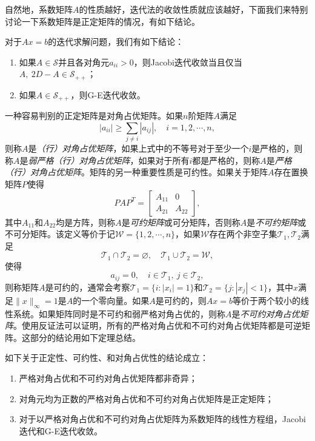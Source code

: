 \documentclass[a4paper,10pt]{ctexart}
\begin{document}
自然地，系数矩阵$ A $的性质越好，迭代法的收敛性质就应该越好，下面我们来特别讨论一下系数矩阵是正定矩阵的情况，有如下结论。
\begin{theorem}
    对于$ Ax=b $的迭代求解问题，我们有如下结论：
    \begin{enumerate}
        \item 如果$ A\in \mathcal{S} $并且各对角元$ a_{ii}>0 $，则Jacobi迭代收敛当且仅当$ A,\ 2D-A\in \mathcal{S}_{++} $；
        \item 如果$ A\in \mathcal{S}_{++} $，则G-E迭代收敛。
    \end{enumerate}
\end{theorem}
一种容易判别的正定矩阵是对角占优矩阵。如果$ n $阶矩阵$ A $满足
\[
    |a_{ii}| \geqslant  \sum_{j\neq i} |a_{ij}|,\quad i=1,2,\cdots,n,
\]
则称$ A $是\emph{（行）对角占优矩阵}，如果上式中的不等号对于至少一个$ i $是严格的，则称$ A $是\emph{弱严格（行）对角占优矩阵}，如果对于所有$ i $都是严格的，则称$ A $是\emph{严格（行）对角占优矩阵}。矩阵的另一种重要性质是可约性。如果关于矩阵$ A $存在置换矩阵$ P $使得
\[
    PAP^T = 
    \begin{bmatrix} 
        A_{11} & 0 \\
        A_{21} & A_{22} 
    \end{bmatrix},
\]
其中$ A_{11} $和$ A_{22} $均是方阵，则称$ A $是\emph{可约矩阵}或可分矩阵，否则称$ A $是\emph{不可约矩阵}或不可分矩阵。该定义等价于记$ \mathcal{W} = \{1,2,\cdots ,n\} $，如果$ \mathcal{W} $存在两个非空子集$ \mathcal{T}_1,\mathcal{T}_2 $满足
\[
    \mathcal{T}_1 \cap \mathcal{T}_2 = \varnothing ,\quad \mathcal{T}_1 \cup \mathcal{T}_2 = \mathcal{W},
\]使得
\[
    a_{ij} = 0, \quad i\in \mathcal{T}_1,\ j\in \mathcal{T}_2,
\]
则称矩阵$ A $是可约的，通常会考察$ \mathcal{T}_1= \{i:|x_i|=1\} $和$ \mathcal{T}_2 = \{j:|x_j|<1\} $，其中$ x $满足$ \| x \|_\infty = 1 $是$ A $的一个零向量。如果$ A $是可约的，则$ Ax=b $等价于两个较小的线性系统。如果矩阵同时是不可约和弱严格对角占优的，则称$ A $是\emph{不可约对角占优矩阵}。使用反证法可以证明，所有的严格对角占优和不可约对角占优矩阵都是可逆矩阵。这部分的结论用如下定理总结。
\begin{theorem}
    如下关于正定性、可约性、和对角占优性的结论成立：
    \begin{enumerate}
        \item 严格对角占优和不可约对角占优矩阵都非奇异；
        \item 对角元均为正数的严格对角占优和不可约对角占优矩阵是正定矩阵；
        \item 对于以严格对角占优和不可约对角占优矩阵为系数矩阵的线性方程组，Jacobi迭代和G-E迭代收敛。
    \end{enumerate}
\end{theorem}
\end{document}

